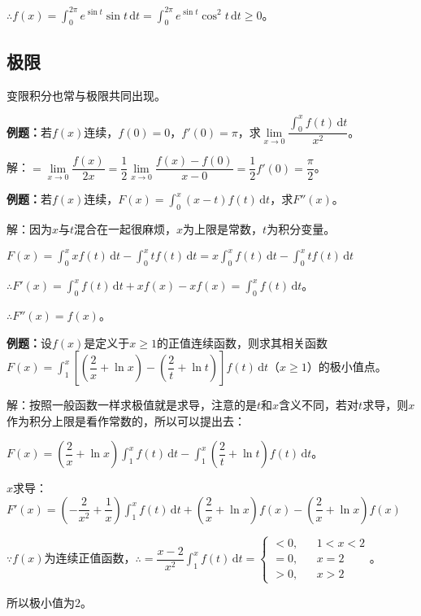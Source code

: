 \documentclass[UTF8, 12pt]{ctexart}
\begin{document}
$\therefore f(x)=\int_0^{2\pi}e^{\sin t}\sin t\,\textrm{d}t=\int_0^{2\pi}e^{\sin t}\cos^2t\,\textrm{d}t\geqslant0$。

\subsection{极限}

变限积分也常与极限共同出现。

\textbf{例题：}若$f(x)$连续，$f(0)=0$，$f'(0)=\pi$，求$\lim\limits_{x\to0}\dfrac{\int_0^xf(t)\,\textrm{d}t}{x^2}$。

解：$=\lim\limits_{x\to0}\dfrac{f(x)}{2x}=\dfrac{1}{2}\lim\limits_{x\to0}\dfrac{f(x)-f(0)}{x-0}=\dfrac{1}{2}f'(0)=\dfrac{\pi}{2}$。

\textbf{例题：}若$f(x)$连续，$F(x)=\int_0^x(x-t)f(t)\,\textrm{d}t$，求$F''(x)$。

解：因为$x$与$t$混合在一起很麻烦，$x$为上限是常数，$t$为积分变量。

$F(x)=\int_0^xxf(t)\,\textrm{d}t-\int_0^xtf(t)\,\textrm{d}t=x\int_0^xf(t)\,\textrm{d}t-\int_0^xtf(t)\,\textrm{d}t$

$\therefore F'(x)=\int_0^xf(t)\,\textrm{d}t+xf(x)-xf(x)=\int_0^xf(t)\,\textrm{d}t$。

$\therefore F''(x)=f(x)$。

\textbf{例题：}设$f(x)$是定义于$x\geqslant1$的正值连续函数，则求其相关函数$F(x)=\displaystyle{\int_1^x\left[\left(\dfrac{2}{x}+\ln x\right)-\left(\dfrac{2}{t}+\ln t\right)\right]f(t)\,\textrm{d}t}$（$x\geqslant1$）的极小值点。\medskip

解：按照一般函数一样求极值就是求导，注意的是$t$和$x$含义不同，若对$t$求导，则$x$作为积分上限是看作常数的，所以可以提出去：

$F(x)=\left(\dfrac{2}{x}+\ln x\right)\displaystyle{\int_1^xf(t)\,\textrm{d}t-\int_1^x\left(\dfrac{2}{t}+\ln t\right)f(t)\,\textrm{d}t}$。

$x$求导：$F'(x)=\left(-\dfrac{2}{x^2}+\dfrac{1}{x}\right)\int_1^xf(t)\,\textrm{d}t+\left(\dfrac{2}{x}+\ln x\right)f(x)-\left(\dfrac{2}{x}+\ln x\right)f(x)$

$\because f(x)$为连续正值函数，$\therefore=\dfrac{x-2}{x^2}\int_1^xf(t)\,\textrm{d}t=\left\{\begin{array}{lcl}
    < 0, & & 1<x<2 \\
    =0, & & x=2 \\
    >0, & & x>2
\end{array}\right.$。

所以极小值为$2$。
\end{document}
